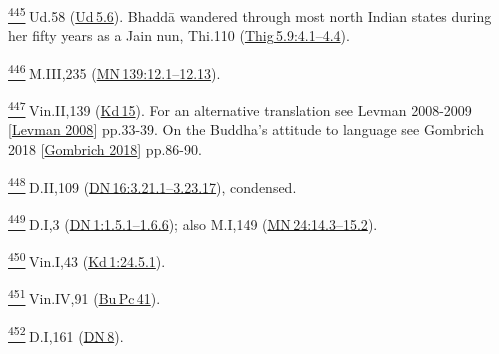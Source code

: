 \label{footprints_split_025.html_fn445}
\hyperref[footprints_split_012.htmlux5cux23fnref445]{\textsuperscript{445}} Ud.58
(\href{https://suttacentral.net/ud5.6/en/sujato}{Ud\,5.6}). Bhaddā
wandered through most north Indian states during her fifty years as a
Jain nun, Thi.110
(\href{https://suttacentral.net/thig5.9/en/sujato\#4.1}{Thig\,5.9:4.1--4.4}).

\label{footprints_split_025.html_fn446}
\hyperref[footprints_split_012.htmlux5cux23fnref446]{\textsuperscript{446}} M.III,235
(\href{https://suttacentral.net/mn139/en/sujato\#12.1}{MN\,139:12.1--12.13}).

\label{footprints_split_025.html_fn447}
\hyperref[footprints_split_012.htmlux5cux23fnref447]{\textsuperscript{447}} Vin.II,139
(\href{https://suttacentral.net/pli-tv-kd15/en/brahmali\#33.1.1}{Kd\,15}).
For an alternative translation see {Levman 2008-2009
{{[}\hyperref[footprints_split_022.htmlux5cux23Levmanux5cux25202008]{Levman
2008}{]}}} pp.33-39. On the Buddha's attitude to language see {Gombrich
2018
{{[}\hyperref[footprints_split_022.htmlux5cux23Gombrichux5cux25202018]{Gombrich
2018}{]}}} pp.86-90.

\label{footprints_split_025.html_fn448}
\hyperref[footprints_split_012.htmlux5cux23fnref448]{\textsuperscript{448}} D.II,109
(\href{https://suttacentral.net/dn16/en/sujato\#3.21.1}{DN\,16:3.21.1--3.23.17}),
condensed.

\label{footprints_split_025.html_fn449}
\hyperref[footprints_split_013.htmlux5cux23fnref449]{\textsuperscript{449}} D.I,3
(\href{https://suttacentral.net/dn1/en/sujato\#1.5.1}{DN\,1:1.5.1--1.6.6});
also M.I,149
(\href{https://suttacentral.net/mn24/en/sujato\#14.3}{MN\,24:14.3--15.2}).

\label{footprints_split_025.html_fn450}
\hyperref[footprints_split_013.htmlux5cux23fnref450]{\textsuperscript{450}} Vin.I,43
(\href{https://suttacentral.net/pli-tv-kd1/en/brahmali\#24.5.1}{Kd\,1:24.5.1}).

\label{footprints_split_025.html_fn451}
\hyperref[footprints_split_013.htmlux5cux23fnref451]{\textsuperscript{451}} Vin.IV,91
(\href{https://suttacentral.net/pli-tv-bu-vb-pc41/en/brahmali?}{Bu\,Pc\,41}).

\label{footprints_split_025.html_fn452}
\hyperref[footprints_split_013.htmlux5cux23fnref452]{\textsuperscript{452}} D.I,161
(\href{https://suttacentral.net/dn8/en/sujato}{DN\,8}).

